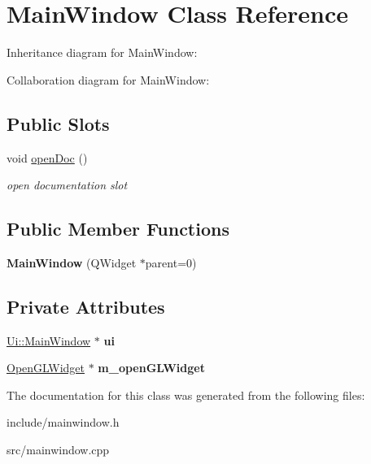 \hypertarget{class_main_window}{\section{Main\-Window Class Reference}
\label{class_main_window}
}


Inheritance diagram for Main\-Window\-:


Collaboration diagram for Main\-Window\-:
\subsection*{Public Slots}
\begin{DoxyCompactItemize}
\item 
\hypertarget{class_main_window_a452fc3db76653e3355cd9eb81bc4f0cf}{void \hyperlink{class_main_window_a452fc3db76653e3355cd9eb81bc4f0cf}{open\-Doc} ()}\label{class_main_window_a452fc3db76653e3355cd9eb81bc4f0cf}

\begin{DoxyCompactList}\small\item\em open documentation slot \end{DoxyCompactList}\end{DoxyCompactItemize}
\subsection*{Public Member Functions}
\begin{DoxyCompactItemize}
\item 
\hypertarget{class_main_window_a8b244be8b7b7db1b08de2a2acb9409db}{{\bfseries Main\-Window} (Q\-Widget $\ast$parent=0)}\label{class_main_window_a8b244be8b7b7db1b08de2a2acb9409db}

\end{DoxyCompactItemize}
\subsection*{Private Attributes}
\begin{DoxyCompactItemize}
\item 
\hypertarget{class_main_window_a35466a70ed47252a0191168126a352a5}{\hyperlink{class_ui_1_1_main_window}{Ui\-::\-Main\-Window} $\ast$ {\bfseries ui}}\label{class_main_window_a35466a70ed47252a0191168126a352a5}

\item 
\hypertarget{class_main_window_af310504f60344259d8a43e495e90e54d}{\hyperlink{class_open_g_l_widget}{Open\-G\-L\-Widget} $\ast$ {\bfseries m\-\_\-open\-G\-L\-Widget}}\label{class_main_window_af310504f60344259d8a43e495e90e54d}

\end{DoxyCompactItemize}


The documentation for this class was generated from the following files\-:\begin{DoxyCompactItemize}
\item 
include/mainwindow.\-h\item 
src/mainwindow.\-cpp\end{DoxyCompactItemize}
